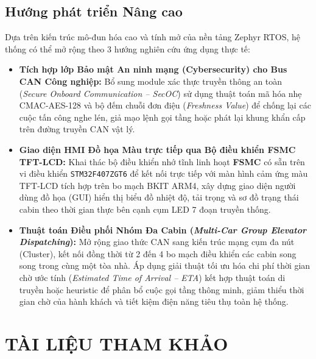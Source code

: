 \subsection{Hướng phát triển Nâng cao}
Dựa trên kiến trúc mô-đun hóa cao và tính mở của nền tảng Zephyr RTOS, hệ thống có thể mở rộng theo 3 hướng nghiên cứu ứng dụng thực tế:
\begin{itemize}[nosep]
    \item \textbf{Tích hợp lớp Bảo mật An ninh mạng (Cybersecurity) cho Bus CAN Công nghiệp:} Bổ sung module xác thực truyền thông an toàn (\textit{Secure Onboard Communication -- SecOC}) sử dụng thuật toán mã hóa nhẹ CMAC-AES-128 và bộ đếm chuỗi đơn điệu (\textit{Freshness Value}) để chống lại các cuộc tấn công nghe lén, giả mạo lệnh gọi tầng hoặc phát lại khung khẩn cấp trên đường truyền CAN vật lý.
    \item \textbf{Giao diện HMI Đồ họa Màu trực tiếp qua Bộ điều khiển FSMC TFT-LCD:} Khai thác bộ điều khiển nhớ tĩnh linh hoạt \textbf{FSMC} có sẵn trên vi điều khiển \texttt{STM32F407ZGT6} để kết nối trực tiếp với màn hình cảm ứng màu TFT-LCD tích hợp trên bo mạch BKIT ARM4, xây dựng giao diện người dùng đồ họa (GUI) hiển thị biểu đồ nhiệt độ, tải trọng và sơ đồ trạng thái cabin theo thời gian thực bên cạnh cụm LED 7 đoạn truyền thống.
    \item \textbf{Thuật toán Điều phối Nhóm Đa Cabin (\textit{Multi-Car Group Elevator Dispatching}):} Mở rộng giao thức CAN sang kiến trúc mạng cụm đa nút (Cluster), kết nối đồng thời từ 2 đến 4 bo mạch điều khiển các cabin song song trong cùng một tòa nhà. Áp dụng giải thuật tối ưu hóa chi phí thời gian chờ ước tính (\textit{Estimated Time of Arrival -- ETA}) kết hợp thuật toán di truyền hoặc heuristic để phân bổ cuộc gọi tầng thông minh, giảm thiểu thời gian chờ của hành khách và tiết kiệm điện năng tiêu thụ toàn hệ thống.
\end{itemize}

\clearpage
{}
{}
\section*{TÀI LIỆU THAM KHẢO}


